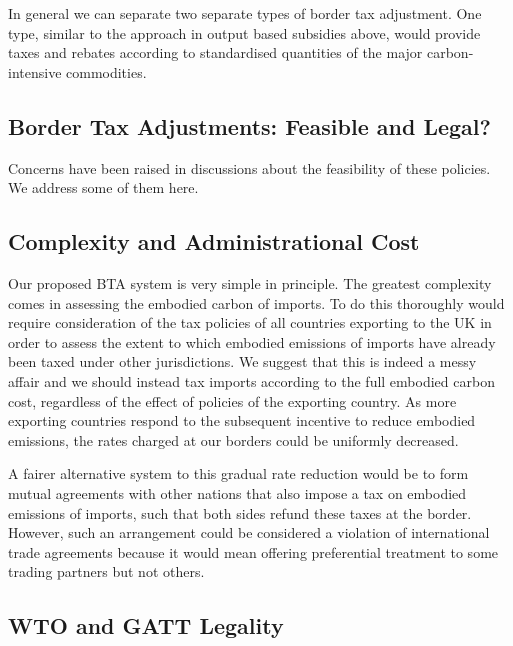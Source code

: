 \documentclass[]{tufte-handout}
\begin{document}
In general we can separate two separate types of border tax adjustment.
One type, similar to the approach in output based subsidies above, would
provide taxes and rebates according to standardised quantities of the
major carbon-intensive commodities.

\hypertarget{border-tax-adjustments-feasible-and-legal}{%
\subsection{Border Tax Adjustments: Feasible and
Legal?}\label{border-tax-adjustments-feasible-and-legal}}

Concerns have been raised in discussions about the feasibility of these
policies. We address some of them here.

\hypertarget{complexity-and-administrational-cost}{%
\subsection{Complexity and Administrational
Cost}\label{complexity-and-administrational-cost}}

Our proposed BTA system is very simple in principle. The greatest
complexity comes in assessing the embodied carbon of imports. To do this
thoroughly would require consideration of the tax policies of all
countries exporting to the UK in order to assess the extent to which
embodied emissions of imports have already been taxed under other
jurisdictions. We suggest that this is indeed a messy affair and we
should instead tax imports according to the full embodied carbon cost,
regardless of the effect of policies of the exporting country. As more
exporting countries respond to the subsequent incentive to reduce
embodied emissions, the rates charged at our borders could be uniformly
decreased.

A fairer alternative system to this gradual rate reduction would be to
form mutual agreements with other nations that also impose a tax on
embodied emissions of imports, such that both sides refund these taxes
at the border. However, such an arrangement could be considered a
violation of international trade agreements because it would mean
offering preferential treatment to some trading partners but not others.

\hypertarget{wto-and-gatt-legality}{%
\subsection{WTO and GATT Legality}\label{wto-and-gatt-legality}}
\end{document}
